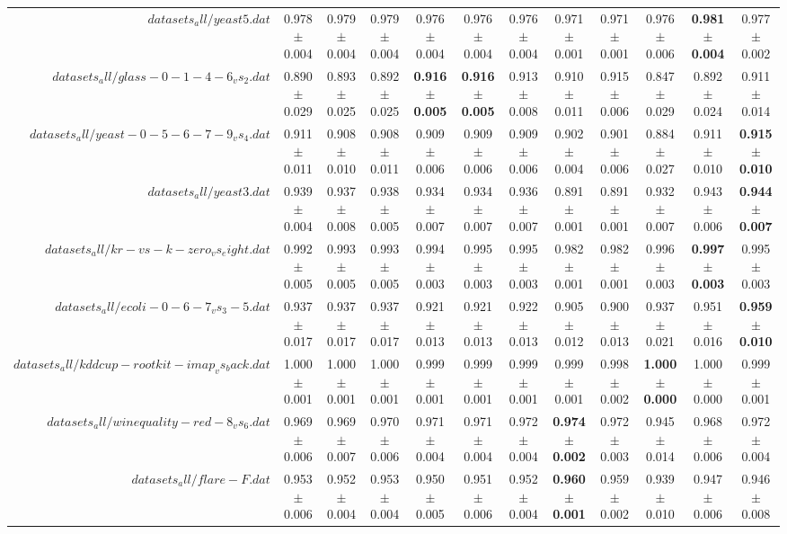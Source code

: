 \begin{table}[!ht]
{\begin{tabular}{r c c c c c c c c c c c}
$datasets_all/yeast5.dat$ & 0.978 $\pm$ 0.004 & 0.979 $\pm$ 0.004 & 0.979 $\pm$ 0.004 & 0.976 $\pm$ 0.004 & 0.976 $\pm$ 0.004 & 0.976 $\pm$ 0.004 & 0.971 $\pm$ 0.001 & 0.971 $\pm$ 0.001 & 0.976 $\pm$ 0.006 & \textbf{0.981 $\pm$ 0.004} & 0.977 $\pm$ 0.002 \\
$datasets_all/glass-0-1-4-6_vs_2.dat$ & 0.890 $\pm$ 0.029 & 0.893 $\pm$ 0.025 & 0.892 $\pm$ 0.025 & \textbf{0.916 $\pm$ 0.005} & \textbf{0.916 $\pm$ 0.005} & 0.913 $\pm$ 0.008 & 0.910 $\pm$ 0.011 & 0.915 $\pm$ 0.006 & 0.847 $\pm$ 0.029 & 0.892 $\pm$ 0.024 & 0.911 $\pm$ 0.014 \\
$datasets_all/yeast-0-5-6-7-9_vs_4.dat$ & 0.911 $\pm$ 0.011 & 0.908 $\pm$ 0.010 & 0.908 $\pm$ 0.011 & 0.909 $\pm$ 0.006 & 0.909 $\pm$ 0.006 & 0.909 $\pm$ 0.006 & 0.902 $\pm$ 0.004 & 0.901 $\pm$ 0.006 & 0.884 $\pm$ 0.027 & 0.911 $\pm$ 0.010 & \textbf{0.915 $\pm$ 0.010} \\
$datasets_all/yeast3.dat$ & 0.939 $\pm$ 0.004 & 0.937 $\pm$ 0.008 & 0.938 $\pm$ 0.005 & 0.934 $\pm$ 0.007 & 0.934 $\pm$ 0.007 & 0.936 $\pm$ 0.007 & 0.891 $\pm$ 0.001 & 0.891 $\pm$ 0.001 & 0.932 $\pm$ 0.007 & 0.943 $\pm$ 0.006 & \textbf{0.944 $\pm$ 0.007} \\
$datasets_all/kr-vs-k-zero_vs_eight.dat$ & 0.992 $\pm$ 0.005 & 0.993 $\pm$ 0.005 & 0.993 $\pm$ 0.005 & 0.994 $\pm$ 0.003 & 0.995 $\pm$ 0.003 & 0.995 $\pm$ 0.003 & 0.982 $\pm$ 0.001 & 0.982 $\pm$ 0.001 & 0.996 $\pm$ 0.003 & \textbf{0.997 $\pm$ 0.003} & 0.995 $\pm$ 0.003 \\
$datasets_all/ecoli-0-6-7_vs_3-5.dat$ & 0.937 $\pm$ 0.017 & 0.937 $\pm$ 0.017 & 0.937 $\pm$ 0.017 & 0.921 $\pm$ 0.013 & 0.921 $\pm$ 0.013 & 0.922 $\pm$ 0.013 & 0.905 $\pm$ 0.012 & 0.900 $\pm$ 0.013 & 0.937 $\pm$ 0.021 & 0.951 $\pm$ 0.016 & \textbf{0.959 $\pm$ 0.010} \\
$datasets_all/kddcup-rootkit-imap_vs_back.dat$ & 1.000 $\pm$ 0.001 & 1.000 $\pm$ 0.001 & 1.000 $\pm$ 0.001 & 0.999 $\pm$ 0.001 & 0.999 $\pm$ 0.001 & 0.999 $\pm$ 0.001 & 0.999 $\pm$ 0.001 & 0.998 $\pm$ 0.002 & \textbf{1.000 $\pm$ 0.000} & 1.000 $\pm$ 0.000 & 0.999 $\pm$ 0.001 \\
$datasets_all/winequality-red-8_vs_6.dat$ & 0.969 $\pm$ 0.006 & 0.969 $\pm$ 0.007 & 0.970 $\pm$ 0.006 & 0.971 $\pm$ 0.004 & 0.971 $\pm$ 0.004 & 0.972 $\pm$ 0.004 & \textbf{0.974 $\pm$ 0.002} & 0.972 $\pm$ 0.003 & 0.945 $\pm$ 0.014 & 0.968 $\pm$ 0.006 & 0.972 $\pm$ 0.004 \\
$datasets_all/flare-F.dat$ & 0.953 $\pm$ 0.006 & 0.952 $\pm$ 0.004 & 0.953 $\pm$ 0.004 & 0.950 $\pm$ 0.005 & 0.951 $\pm$ 0.006 & 0.952 $\pm$ 0.004 & \textbf{0.960 $\pm$ 0.001} & 0.959 $\pm$ 0.002 & 0.939 $\pm$ 0.010 & 0.947 $\pm$ 0.006 & 0.946 $\pm$ 0.008 \\

\end{tabular}}
\end{table}
